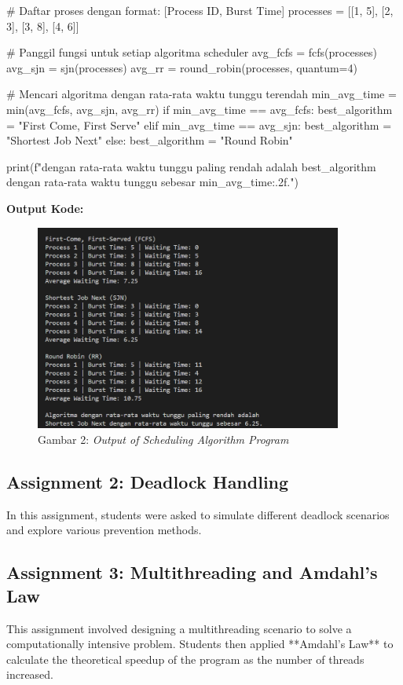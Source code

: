 \documentclass[12pt]{article}
\begin{document}
\begin{python}
# Daftar proses dengan format: [Process ID, Burst Time]
processes = [[1, 5], [2, 3], [3, 8], [4, 6]]

# Panggil fungsi untuk setiap algoritma scheduler
avg_fcfs = fcfs(processes)
avg_sjn = sjn(processes)
avg_rr = round_robin(processes, quantum=4)

# Mencari algoritma dengan rata-rata waktu tunggu terendah
min_avg_time = min(avg_fcfs, avg_sjn, avg_rr)
if min_avg_time == avg_fcfs:
    best_algorithm = "First Come, First Serve"
elif min_avg_time == avg_sjn:
    best_algorithm = "Shortest Job Next"
else:
    best_algorithm = "Round Robin"

print(f"\nAlgoritma dengan rata-rata waktu tunggu paling rendah adalah {best_algorithm} dengan rata-rata waktu tunggu sebesar {min_avg_time:.2f}.")
        \end{python}
        \noindent \textbf{Output Kode:}
        \begin{figure}[h]
            \centering
            \includegraphics[width=0.9\textwidth]{asset/a1-output.png}
                        \caption{Gambar 2: \textit{Output of Scheduling Algorithm Program}}
            \label{fig:a1-output}
        \end{figure}

\subsection{Assignment 2: Deadlock Handling}
In this assignment, students were asked to simulate different deadlock scenarios and explore various prevention methods.

\subsection{Assignment 3: Multithreading and Amdahl's Law}
This assignment involved designing a multithreading scenario to solve a computationally intensive problem. Students then applied **Amdahl's Law** to calculate the theoretical speedup of the program as the number of threads increased.
\end{document}
